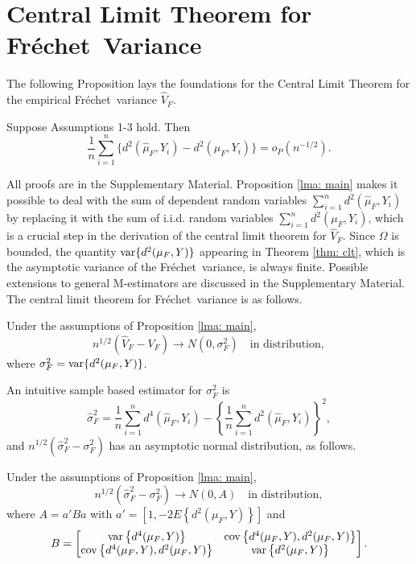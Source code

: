 \documentclass[lineno]{biometrika}
\def\cov{{\rm cov}}
\def\var{{\rm var}}
\def\cov{{\rm cov}}
\def\var{{\rm var}}
\def\O{\Omega}
\def\F{Fr\'{e}chet}
\def\lra{\longrightarrow}
\def\hmu{\hat{\mu}_F}
\def\muF{\mu_F}
\def\VF{\hat{V}_F}
\def\s1n{\sum_{i=1}^n}
\begin{document}
\section{Central Limit Theorem for \F \ Variance}
\label{sec: theory}
The following Proposition  lays the foundations for the Central Limit Theorem for the empirical \F \ variance $\VF$.
\begin{proposition}
	\label{lma: main}
	Suppose Assumptions 1-3 hold. Then 
	\begin{equation*}
	\label{eq: main}
	\frac{1}{n}\sum_{i=1}^{n}\{d^2(\hat{\mu}_F,Y_i)-d^2(\mu_F,Y_i)\}  = o_P(n^{-1/2}).
	\end{equation*}
\end{proposition}
All proofs are in the Supplementary Material. Proposition  \ref{lma: main} makes it possible to  deal with the sum of dependent random variables $\s1n d^2(\hmu,Y_i)$ by replacing it with the sum of i.i.d. random variables $\s1n d^2(\muF,Y_i)$, which is a crucial step in the derivation of the central limit theorem for $\VF$. %
Since $\O$ is bounded, {the quantity $\var\{d^2(\mu_F,Y)\}$ appearing in Theorem \ref{thm: clt}, which is the asymptotic variance of the \F \ variance}, is always finite. Possible extensions to general M-estimators are discussed in the Supplementary Material.  The  central limit theorem for \F \ variance is as follows. 
\begin{theorem}
	\label{thm: clt}
	Under the assumptions of Proposition  \ref{lma: main},
	\begin{equation*}
	\label{eq: clt}
	{n}^{1/2}(\VF-V_F)\lra N(0,\sigma_F^2) \quad \text{in distribution}, 
	\end{equation*}
	where $\sigma_F^2=\var\{d^2(\mu_F,Y)\}$.
\end{theorem}
An intuitive sample based estimator for $\sigma_F^2$ is  
\begin{equation}
\label{eq: var_est}
\hat{\sigma}_F^2=\frac{1}{n}\sum_{i=1}^{n} d^4(\hat{\mu}_F,Y_i)-\left \{ \frac{1}{n}\sum_{i=1}^{n}d^2(\hat{\mu}_F,Y_i)\right \} ^2  , 
\end{equation}
and $n^{1/2}\left(\widehat{\sigma}_F^2 -\sigma_F^2 \right)$ has an asymptotic normal distribution, as follows. 
\begin{proposition}
	\label{lma: consistency}
	Under the assumptions of Proposition  \ref{lma: main},
	\begin{equation*}
	\label{eq: consistency}
	n^{1/2} \left( \widehat{\sigma}_F^2 -\sigma_F^2 \right) \lra  N(0,A) \quad \text{in distribution}, 
	\end{equation*}
	where $A=a'Ba$ with $a'= \left[1,
	-2E\left\{d^2(\mu_F,Y)\right\}\right]$ and $$B=\begin{bmatrix}
	\var\left\{d^4(\mu_F,Y)\right\} & \cov \left \{d^4(\mu_F,Y),d^2(\mu_F,Y)\right \} \\
	\cov \left \{d^4(\mu_F,Y),d^2(\mu_F,Y)\right \}& \var\left \{d^2(\mu_F,Y)\right \}
	\end{bmatrix}.$$
\end{proposition}
\end{document}
